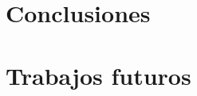 
\chapter{Conclusiones}\label{ch:conclusiones}

\chapter{Trabajos futuros}\label{ch:trabajos-futuros}

\endinput